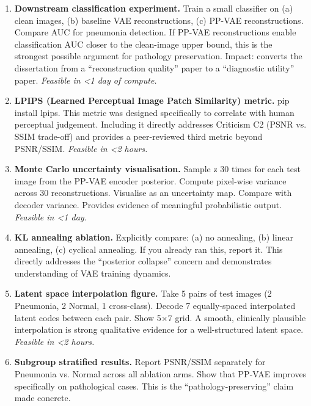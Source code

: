 \documentclass[12pt, a4paper]{article}
\begin{document}
\begin{enumerate}

\item \textbf{Downstream classification experiment.}
Train a small classifier on (a) clean images, (b) baseline VAE
reconstructions, (c) PP-VAE reconstructions. Compare AUC for
pneumonia detection. If PP-VAE reconstructions enable classification
AUC closer to the clean-image upper bound, this is the strongest
possible argument for pathology preservation. Impact: converts
the dissertation from a ``reconstruction quality'' paper to a
``diagnostic utility'' paper. \textit{Feasible in <1 day of compute.}

\item \textbf{LPIPS (Learned Perceptual Image Patch Similarity) metric.}
pip install lpips. This metric was designed specifically to
correlate with human perceptual judgement. Including it directly
addresses Criticism C2 (PSNR vs. SSIM trade-off) and provides
a peer-reviewed third metric beyond PSNR/SSIM.
\textit{Feasible in <2 hours.}

\item \textbf{Monte Carlo uncertainty visualisation.}
Sample z 30 times for each test image from the PP-VAE encoder
posterior. Compute pixel-wise variance across 30 reconstructions.
Visualise as an uncertainty map. Compare with decoder variance.
Provides evidence of meaningful probabilistic output.
\textit{Feasible in <1 day.}

\item \textbf{KL annealing ablation.}
Explicitly compare: (a) no annealing, (b) linear annealing,
(c) cyclical annealing. If you already ran this, report it.
This directly addresses the ``posterior collapse'' concern and
demonstrates understanding of VAE training dynamics.

\item \textbf{Latent space interpolation figure.}
Take 5 pairs of test images (2 Pneumonia, 2 Normal, 1 cross-class).
Decode 7 equally-spaced interpolated latent codes between each pair.
Show 5×7 grid. A smooth, clinically plausible interpolation is
strong qualitative evidence for a well-structured latent space.
\textit{Feasible in <2 hours.}

\item \textbf{Subgroup stratified results.}
Report PSNR/SSIM separately for Pneumonia vs. Normal across
all ablation arms. Show that PP-VAE improves specifically on
pathological cases. This is the ``pathology-preserving'' claim
made concrete.


\end{enumerate}
\end{document}
